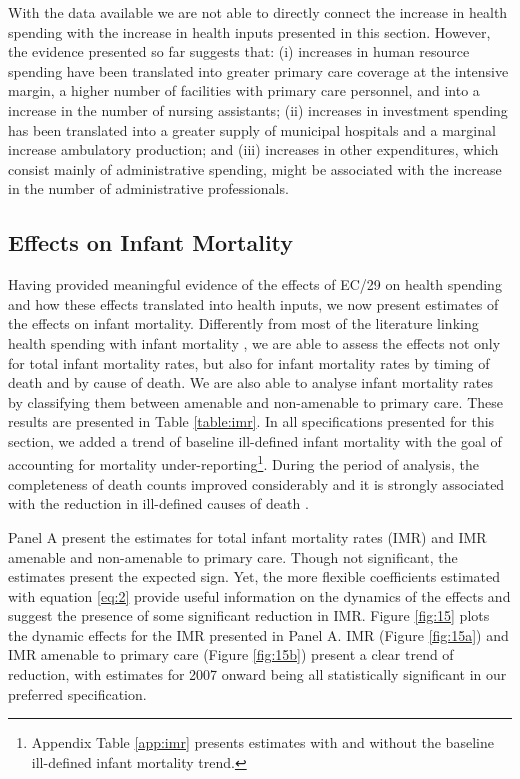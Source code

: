 





With the data available we are not able to directly connect the increase in health spending with the increase in health inputs presented in this section. However, the evidence presented so far suggests that: (i) increases in human resource spending have been translated into greater primary care coverage at the intensive margin, a higher number of facilities with primary care personnel, and into a increase in the number of nursing assistants; (ii) increases in investment spending has been translated into a greater supply of municipal hospitals and a marginal increase ambulatory production; and (iii) increases in other expenditures, which consist mainly of administrative spending, might be associated with the increase in the number of administrative professionals.


\subsection{Effects on Infant Mortality}

Having provided meaningful evidence of the effects of EC/29 on health spending and how these effects translated into health inputs, we now present estimates of the effects on infant mortality. Differently from most of the literature linking health spending with infant mortality \citep{filmer1999,bokhari2007,moreno2015,nixon2006,gupta2002effectiveness,cremieux1999,bokhari2007}, we are able to assess the effects not only for total infant mortality rates, but also for infant mortality rates by timing of death and by cause of death. We are also able to analyse infant mortality rates by classifying them between amenable and non-amenable to primary care. These results are presented in Table \ref{table:imr}. In all specifications presented for this section, we added a trend of baseline ill-defined infant mortality with the goal of accounting for mortality under-reporting\footnote{Appendix Table \ref{app:imr} presents estimates with and without the baseline ill-defined infant mortality trend.}. During the period of analysis, the completeness of death counts improved considerably and it is strongly associated with the reduction in ill-defined causes of death \citep{lima2014evolution}.



Panel A present the estimates for total infant mortality rates (IMR) and IMR amenable and non-amenable to primary care. Though not significant, the estimates present the expected sign. Yet, the more flexible coefficients estimated with equation \ref{eq:2} provide useful information on the dynamics of the effects and suggest the presence of some significant reduction in IMR. Figure \ref{fig:15} plots the dynamic effects for the IMR presented in Panel A. IMR (Figure \ref{fig:15a}) and IMR amenable to primary care (Figure \ref{fig:15b})  present a clear trend of reduction, with estimates for 2007 onward being all statistically significant in our preferred specification. 

